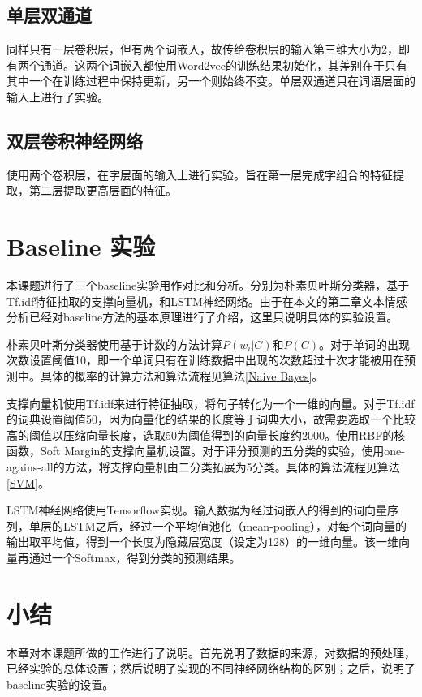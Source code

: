 \subsection{单层双通道}
同样只有一层卷积层，但有两个词嵌入，故传给卷积层的输入第三维大小为2，即有两个通道。这两个词嵌入都使用Word2vec的训练结果初始化，其差别在于只有其中一个在训练过程中保持更新，另一个则始终不变。单层双通道只在词语层面的输入上进行了实验。

\subsection{双层卷积神经网络}
使用两个卷积层，在字层面的输入上进行实验。旨在第一层完成字组合的特征提取，第二层提取更高层面的特征。

\section{Baseline 实验}
本课题进行了三个baseline实验用作对比和分析。分别为朴素贝叶斯分类器，基于Tf.idf特征抽取的支撑向量机，和LSTM神经网络。由于在本文的第二章文本情感分析已经对baseline方法的基本原理进行了介绍，这里只说明具体的实验设置。

朴素贝叶斯分类器使用基于计数的方法计算$P(w_i|C)$和$P(C)$。对于单词的出现次数设置阈值10，即一个单词只有在训练数据中出现的次数超过十次才能被用在预测中。具体的概率的计算方法和算法流程见算法\ref{Naive Bayes}。

支撑向量机使用Tf.idf来进行特征抽取，将句子转化为一个一维的向量。对于Tf.idf的词典设置阈值50，因为向量化的结果的长度等于词典大小，故需要选取一个比较高的阈值以压缩向量长度，选取50为阈值得到的向量长度约2000。使用RBF的核函数，Soft Margin的支撑向量机设置。对于评分预测的五分类的实验，使用one-agains-all的方法，将支撑向量机由二分类拓展为5分类。具体的算法流程见算法\ref{SVM}。

LSTM神经网络使用Tensorflow实现。输入数据为经过词嵌入的得到的词向量序列，单层的LSTM之后，经过一个平均值池化（mean-pooling），对每个词向量的输出取平均值，得到一个长度为隐藏层宽度（设定为128）的一维向量。该一维向量再通过一个Softmax，得到分类的预测结果。

\section{小结}
本章对本课题所做的工作进行了说明。首先说明了数据的来源，对数据的预处理，已经实验的总体设置；然后说明了实现的不同神经网络结构的区别；之后，说明了baseline实验的设置。
